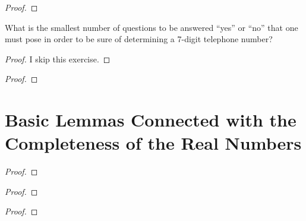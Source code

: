 \begin{exercise}
\end{exercise}

\begin{proof}
\end{proof}
\newpage

\begin{exercise}
    What is the smallest number of questions to be answered ``yes'' or ``no'' that one must pose in order to be sure of determining a 7-digit telephone number?
\end{exercise}

\begin{proof}
    I skip this exercise.
\end{proof}
\newpage

\begin{exercise}
\end{exercise}

\begin{proof}
\end{proof}
\newpage

\section{Basic Lemmas Connected with the Completeness of the Real Numbers}

\begin{exercise}
\end{exercise}

\begin{proof}
\end{proof}
\newpage

\begin{exercise}
\end{exercise}

\begin{proof}
\end{proof}
\newpage

\begin{exercise}
\end{exercise}

\begin{proof}
\end{proof}
\newpage

\begin{exercise}
\end{exercise}


